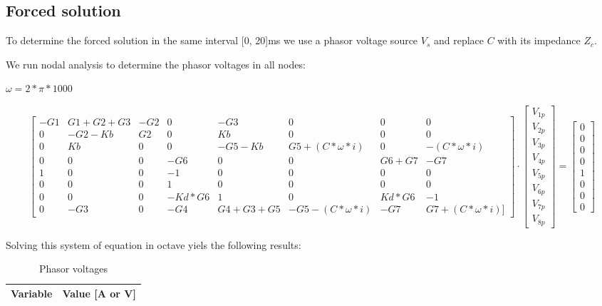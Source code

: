 \subsection{Forced solution}

To determine the forced solution in the same interval [0, 20]ms we use a phasor voltage source $V_s$ and replace $C$ with its impedance $Z_c$.

We run nodal analysis to determine the phasor voltages in all nodes:

 $\omega=2*\pi*1000$
 
  \begin{equation}\label{eq:matrixeq3}
\begin{bmatrix}
-G1 & G1+G2+G3 & -G2 & 0 & -G3 & 0 & 0 & 0\\
0 & -G2-Kb & G2 & 0 & Kb & 0 & 0 & 0\\
0 & Kb & 0 & 0 & -G5-Kb & G5+(C*\omega*i) & 0 & -(C*\omega*i)\\
0 & 0 & 0 & -G6 & 0 & 0 & G6+G7 & -G7\\
1 & 0 & 0 & -1 & 0 & 0 & 0 & 0\\
0 & 0 & 0 & 1 & 0 & 0 & 0 & 0\\
0 & 0 & 0 & -Kd*G6 & 1 & 0 & Kd*G6 & -1\\
0 & -G3 & 0 & -G4 & G4+G3+G5 & -G5-(C*\omega*i) & -G7 & G7+(C*\omega*i)]
\end{bmatrix}
\cdot
\begin{bmatrix}
V_{1p} \\
V_{2p} \\
V_{3p} \\
V_{4p} \\
V_{5p} \\
V_{6p} \\
V_{7p} \\
V_{8p} 
    \end{bmatrix}
=
    \begin{bmatrix}
0 \\
0 \\
0 \\
0 \\
1 \\
0 \\
0 \\
0 
    \end{bmatrix}
  \end{equation}



Solving this system of equation in octave yiels the following results:

\begin{table}[H]
    \centering
    \begin{tabular}{|l|r|}
      \hline    
      {\bf Variable} & {\bf Value [A or V]} \\ \hline
      
    \end{tabular}
    \caption{Phasor voltages}
    \label{tab:phasorvoltages}
  \end{table}
  
